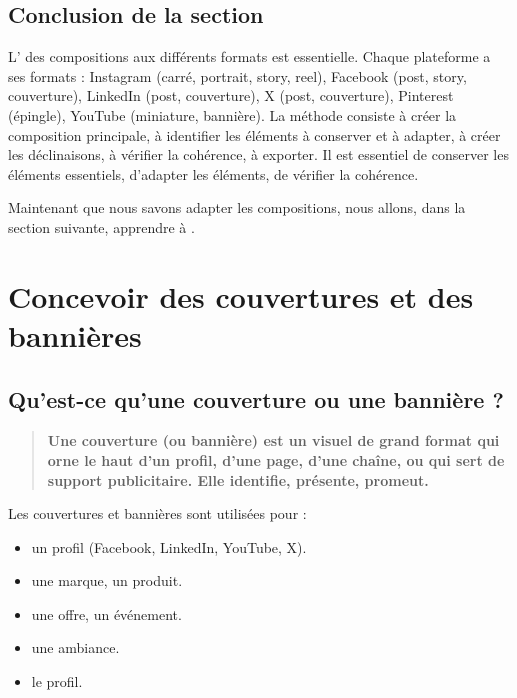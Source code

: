 \subsection*{Conclusion de la section}

L' des compositions aux différents formats est essentielle. Chaque plateforme a ses formats : Instagram (carré, portrait, story, reel), Facebook (post, story, couverture), LinkedIn (post, couverture), X (post, couverture), Pinterest (épingle), YouTube (miniature, bannière). La méthode consiste à créer la composition principale, à identifier les éléments à conserver et à adapter, à créer les déclinaisons, à vérifier la cohérence, à exporter. Il est essentiel de conserver les éléments essentiels, d'adapter les éléments, de vérifier la cohérence.

Maintenant que nous savons adapter les compositions, nous allons, dans la section suivante, apprendre à .

\section{Concevoir des couvertures et des bannières}

\subsection{Qu'est-ce qu'une couverture ou une bannière ?}

\begin{quote}
\textbf{Une couverture (ou bannière) est un visuel de grand format qui orne le haut d'un profil, d'une page, d'une chaîne, ou qui sert de support publicitaire. Elle identifie, présente, promeut.}
\end{quote}

Les couvertures et bannières sont utilisées pour :

\begin{itemize}
    \item {} un profil (Facebook, LinkedIn, YouTube, X).
    \item {} une marque, un produit.
    \item {} une offre, un événement.
    \item {} une ambiance.
    \item {} le profil.
\end{itemize}

